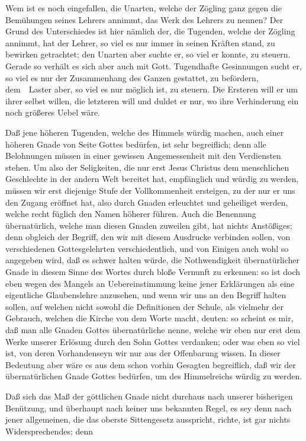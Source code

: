 \begin{aufza}
\begin{aufzb}
 Wem ist es noch eingefallen, die Unarten, welche der Zögling ganz gegen die Bemühungen seines Lehrers annimmt, das Werk des Lehrers zu nennen? Der Grund des Unterschiedes ist hier nämlich der, die Tugenden, welche der Zögling annimmt, hat der Lehrer, so viel es nur immer in seinen Kräften stand, zu bewirken getrachtet; den Unarten aber suchte er, so viel er konnte, zu steuern. Gerade so verhält es sich aber auch mit Gott. Tugendhafte Gesinnungen sucht er, so viel es nur der Zusammenhang des Ganzen gestattet, zu befördern, dem~\ Laster aber, so viel es nur möglich ist, zu steuern. Die Ersteren will er um ihrer selbst willen, die letzteren will und duldet er nur, wo ihre Verhinderung ein noch größeres Uebel wäre. 
\end{aufzb}
\item Daß jene höheren Tugenden, welche des Himmels würdig machen, auch einer höheren Gnade von Seite Gottes bedürfen, ist sehr begreiflich; denn alle Belohnungen müssen in einer gewissen Angemessenheit mit den Verdiensten stehen. Um also der Seligkeiten, die nur erst Jesus Christus dem menschlichen Geschlechte in der andern Welt bereitet hat, empfänglich und würdig zu werden, müssen wir erst diejenige Stufe der Vollkommenheit ersteigen, zu der nur er uns den Zugang eröffnet hat, also durch Gnaden erleuchtet und geheiliget werden, welche recht füglich den Namen höherer führen. Auch die Benennung übernatürlich, welche man diesen Gnaden zuweilen gibt, hat nichts Anstößiges; denn obgleich der Begriff, den wir mit diesem Ausdrucke verbinden sollen, von verschiedenen Gottesgelehrten verschiedentlich, und von Einigen auch wohl so angegeben wird, daß es schwer halten würde, die Nothwendigkeit übernatürlicher Gnade in diesem Sinne des Wortes durch bloße Vernunft zu erkennen: so ist doch eben wegen des Mangels an Uebereinstimmung keine jener Erklärungen als eine eigentliche Glaubenslehre anzusehen, und wenn wir uns an den Begriff halten sollen, auf welchen nicht sowohl die Definitionen der Schule, als vielmehr der Gebrauch, welchen die Kirche von dem Worte macht, deuten: so scheint es mir, daß man alle Gnaden Gottes übernatürliche nenne, welche wir eben nur erst dem Werke unserer Erlösung durch den Sohn Gottes verdanken; oder was eben so viel ist, von deren Vorhandenseyn wir nur aus der Offenbarung wissen. In dieser Bedeutung aber wäre es aus dem schon vorhin Gesagten begreiflich, daß wir der übernatürlichen Gnade Gottes bedürfen, um des Himmelreichs würdig zu werden.
\item Daß sich das Maß der göttlichen Gnade nicht durchaus nach unserer bisherigen Benützung, und überhaupt nach keiner uns bekannten Regel, es sey denn nach jener allgemeinen, die das oberste Sittengesetz ausspricht, richte, ist gar nichts Widersprechendes; denn~

\end{aufza}
